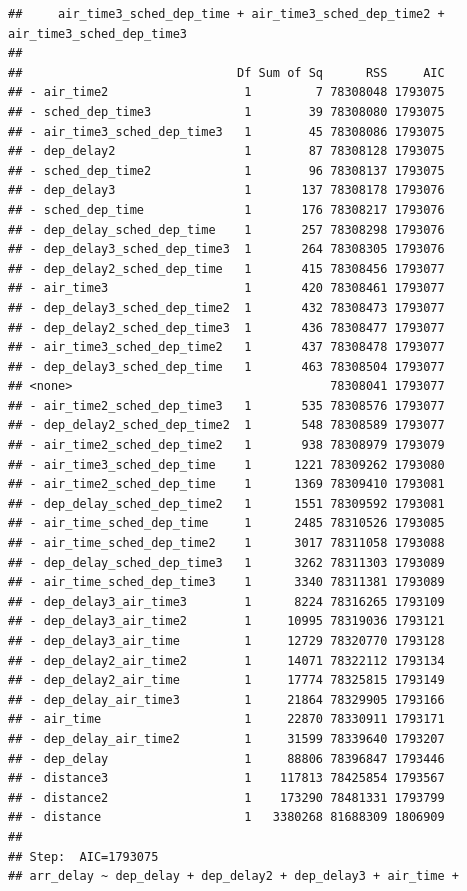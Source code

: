 \documentclass[
]{article}
\begin{document}
\begin{verbatim}
##     air_time3_sched_dep_time + air_time3_sched_dep_time2 + air_time3_sched_dep_time3
## 
##                              Df Sum of Sq      RSS     AIC
## - air_time2                   1         7 78308048 1793075
## - sched_dep_time3             1        39 78308080 1793075
## - air_time3_sched_dep_time3   1        45 78308086 1793075
## - dep_delay2                  1        87 78308128 1793075
## - sched_dep_time2             1        96 78308137 1793075
## - dep_delay3                  1       137 78308178 1793076
## - sched_dep_time              1       176 78308217 1793076
## - dep_delay_sched_dep_time    1       257 78308298 1793076
## - dep_delay3_sched_dep_time3  1       264 78308305 1793076
## - dep_delay2_sched_dep_time   1       415 78308456 1793077
## - air_time3                   1       420 78308461 1793077
## - dep_delay3_sched_dep_time2  1       432 78308473 1793077
## - dep_delay2_sched_dep_time3  1       436 78308477 1793077
## - air_time3_sched_dep_time2   1       437 78308478 1793077
## - dep_delay3_sched_dep_time   1       463 78308504 1793077
## <none>                                    78308041 1793077
## - air_time2_sched_dep_time3   1       535 78308576 1793077
## - dep_delay2_sched_dep_time2  1       548 78308589 1793077
## - air_time2_sched_dep_time2   1       938 78308979 1793079
## - air_time3_sched_dep_time    1      1221 78309262 1793080
## - air_time2_sched_dep_time    1      1369 78309410 1793081
## - dep_delay_sched_dep_time2   1      1551 78309592 1793081
## - air_time_sched_dep_time     1      2485 78310526 1793085
## - air_time_sched_dep_time2    1      3017 78311058 1793088
## - dep_delay_sched_dep_time3   1      3262 78311303 1793089
## - air_time_sched_dep_time3    1      3340 78311381 1793089
## - dep_delay3_air_time3        1      8224 78316265 1793109
## - dep_delay3_air_time2        1     10995 78319036 1793121
## - dep_delay3_air_time         1     12729 78320770 1793128
## - dep_delay2_air_time2        1     14071 78322112 1793134
## - dep_delay2_air_time         1     17774 78325815 1793149
## - dep_delay_air_time3         1     21864 78329905 1793166
## - air_time                    1     22870 78330911 1793171
## - dep_delay_air_time2         1     31599 78339640 1793207
## - dep_delay                   1     88806 78396847 1793446
## - distance3                   1    117813 78425854 1793567
## - distance2                   1    173290 78481331 1793799
## - distance                    1   3380268 81688309 1806909
## 
## Step:  AIC=1793075
## arr_delay ~ dep_delay + dep_delay2 + dep_delay3 + air_time + 

\end{verbatim}
\end{document}
